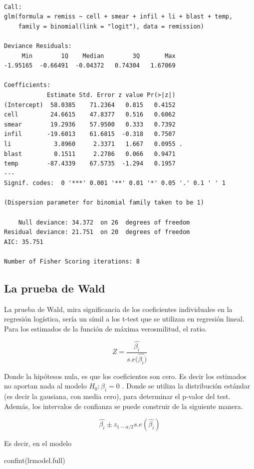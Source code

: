 \documentclass[
  letterpaper,
  DIV=11,
  numbers=noendperiod]{scrartcl}
\newenvironment{Shaded}{\begin{snugshade}}{\end{snugshade}}
\newcommand{\FunctionTok}[1]{\textcolor[rgb]{0.28,0.35,0.67}{#1}}
\newcommand{\NormalTok}[1]{\textcolor[rgb]{0.00,0.23,0.31}{#1}}
\begin{document}
\begin{verbatim}

Call:
glm(formula = remiss ~ cell + smear + infil + li + blast + temp, 
    family = binomial(link = "logit"), data = remission)

Deviance Residuals: 
     Min        1Q    Median        3Q       Max  
-1.95165  -0.66491  -0.04372   0.74304   1.67069  

Coefficients:
            Estimate Std. Error z value Pr(>|z|)  
(Intercept)  58.0385    71.2364   0.815   0.4152  
cell         24.6615    47.8377   0.516   0.6062  
smear        19.2936    57.9500   0.333   0.7392  
infil       -19.6013    61.6815  -0.318   0.7507  
li            3.8960     2.3371   1.667   0.0955 .
blast         0.1511     2.2786   0.066   0.9471  
temp        -87.4339    67.5735  -1.294   0.1957  
---
Signif. codes:  0 '***' 0.001 '**' 0.01 '*' 0.05 '.' 0.1 ' ' 1

(Dispersion parameter for binomial family taken to be 1)

    Null deviance: 34.372  on 26  degrees of freedom
Residual deviance: 21.751  on 20  degrees of freedom
AIC: 35.751

Number of Fisher Scoring iterations: 8
\end{verbatim}

\hypertarget{la-prueba-de-wald}{%
\subsection{La prueba de Wald}\label{la-prueba-de-wald}}

La prueba de Wald, mira significancia de los coeficientes individuales
en la regresión logística, sería un símil a los t-test que se utilizan
en regresión lineal. Para los estimados de la función de máxima
verosmilitud, el ratio.

\[
Z= \frac{\hat{\beta_i}}{s.e(\hat{\beta_i)}}
\]

Donde la hipótesos nula, es que los coeficientes son cero. Es decir los
estimados no aportan nada al modelo \(H_0: \beta_i=0\) . Donde se
utiliza la distribución estándar (es decir la gausiana, con media cero),
para determinar el p-valor del test. Además, los intervalos de confianza
se puede construir de la siguiente manera.

\[
\hat{\beta_i} \pm z_{1-\alpha/2}s.e(\hat{\beta_i})
\]

Es decir, en el modelo

\begin{Shaded}
\begin{Highlighting}[]
\FunctionTok{confint}\NormalTok{(lrmodel.full)}
\end{Highlighting}
\end{Shaded}
\end{document}
